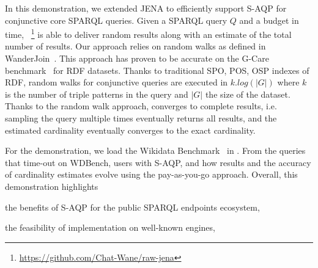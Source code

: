   In this demonstration, we extended JENA to efficiently support
  S-AQP for conjunctive core
  SPARQL queries. Given a SPARQL query $Q$ and a budget in time,
  \NAME~\footnote{\url{https://github.com/Chat-Wane/raw-jena}} is able
  to deliver random results along with an estimate of the
  total number of results. Our approach relies on random
 walks as defined in WanderJoin~\cite{li2016wanderjoin}. This approach
 has proven to be accurate on the G-Care
 benchmark~\cite{DBLP:conf/sigmod/ParkKBKHH20} for RDF datasets. Thanks
 to traditional SPO, POS, OSP indexes of RDF, random
 walks for conjunctive queries are executed in $k.log(|G|)$ where
 $k$ is the number of triple patterns in the query and $|G|$ the size
 of the dataset. Thanks to the random walk approach, \NAME converges
 to complete results, i.e. sampling the query multiple times eventually
 returns all results, and the estimated cardinality eventually converges
 to the exact cardinality.

\noindent For the demonstration, we load the Wikidata
Benchmark~\cite{angles2022wdbench} in \NAME. From the queries that
time-out on WDBench, users  with S-AQP,
and how results and the accuracy of cardinality estimates evolve using
the pay-as-you-go approach. Overall, this demonstration highlights
\begin{inparaenum}[(i)]
\item the benefits of S-AQP for the public SPARQL endpoints ecosystem,
\item the feasibility of implementation on well-known engines,
\end{inparaenum}


